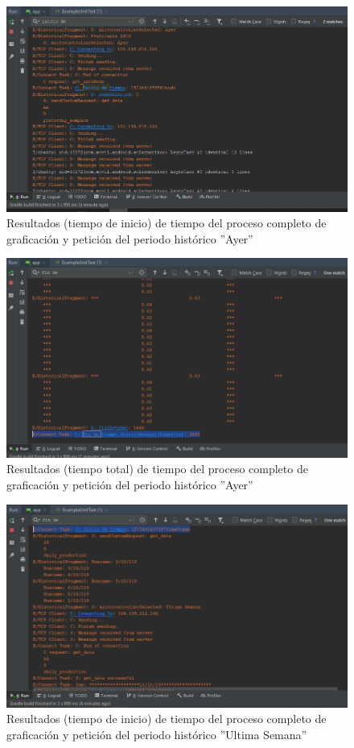 \begin{figure}[H]
	\centering
	\includegraphics[scale=.6]{Capitulo5/images/TiempoCompletoAyer.png}
	\caption{Resultados (tiempo de inicio) de tiempo del proceso completo de graficación y petición del periodo histórico ''Ayer''}	\label{fig:TiempoCompletoHAyer}
\end{figure} 
\begin{figure}[H]
	\centering
	\includegraphics[scale=.6]{Capitulo5/images/TiempoCompletoAyer2.png}
	\caption{Resultados (tiempo total) de tiempo del proceso completo de graficación y petición del periodo histórico ''Ayer''}	\label{fig:TiempoCompletoHAyer2}
\end{figure} 
\begin{figure}[H]
	\centering
	\includegraphics[scale=.6]{Capitulo5/images/TiempoCompletoUltimaSemana.png}
	\caption{Resultados (tiempo de inicio) de tiempo del proceso completo de graficación y petición del periodo histórico ''Ultima Semana''}	\label{fig:TiempoCompletoHUltimaSemana}
\end{figure} 
